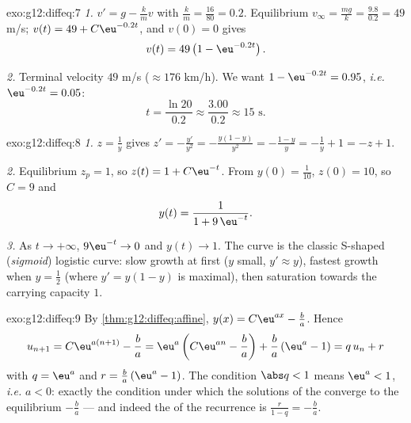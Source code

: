 \begin{solution}{exo:g12:diffeq:7}
\emph{1.} $v' = g - \frac{k}{m} v$ with $\frac km = \frac{16}{80} = 0.2$.
Equilibrium $v_\infty = \frac{mg}{k} = \frac{9.8}{0.2} = 49$ m/s;
$v(t) = 49 + C\eu^{-0.2t}$, and $v(0) = 0$ gives
\[
v(t) = 49\left(1 - \eu^{-0.2 t}\right).
\]

\emph{2.} Terminal velocity $49$ m/s ($\approx 176$ km/h). We want
$1 - \eu^{-0.2t} = 0.95$, \emph{i.e.} $\eu^{-0.2t} = 0.05$:
\[
t = \frac{\ln 20}{0.2} \approx \frac{3.00}{0.2} \approx 15 \text{ s}.
\]
\end{solution}

\begin{solution}{exo:g12:diffeq:8}
\emph{1.} $z = \frac1y$ gives $z' = -\frac{y'}{y^2}
= -\frac{y(1-y)}{y^2} = -\frac{1-y}{y} = -\frac1y + 1 = -z + 1$.

\emph{2.} Equilibrium $z_p = 1$, so $z(t) = 1 + C\eu^{-t}$. From
$y(0) = \frac{1}{10}$, $z(0) = 10$, so $C = 9$ and
\[
y(t) = \frac{1}{1 + 9\,\eu^{-t}} .
\]

\emph{3.} As $t \to +\infty$, $9\eu^{-t} \to 0$ and $y(t) \to 1$. The curve
is the classic S-shaped (\emph{sigmoid}) logistic curve: slow growth at
first ($y$ small, $y' \approx y$), fastest growth when $y = \frac12$
(where $y' = y(1-y)$ is maximal), then saturation towards the carrying
capacity $1$.
\end{solution}

\begin{solution}{exo:g12:diffeq:9}
By \cref{thm:g12:diffeq:affine}, $y(x) = C\eu^{ax} - \frac ba$. Hence
\[
u_{n+1} = C\eu^{a(n+1)} - \frac ba
= \eu^{a}\left(C\eu^{an} - \frac ba\right) + \frac ba\left(\eu^a - 1\right)
= q\,u_n + r
\]
with $q = \eu^{a}$ and $r = \frac{b}{a}\left(\eu^{a} - 1\right)$.
The condition $\abs q < 1$ means $\eu^a < 1$, \emph{i.e.} $a < 0$: exactly
the condition under which the solutions of the 
converge to the equilibrium $-\frac ba$ --- and indeed the  of
the recurrence is $\frac{r}{1 - q} = -\frac{b}{a}$.
\end{solution}

